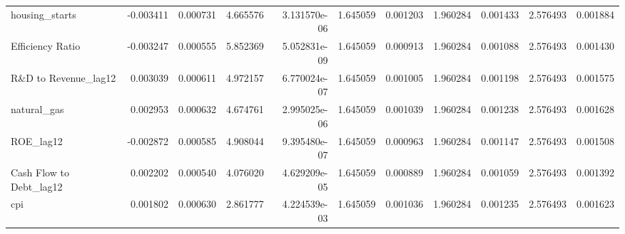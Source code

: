 \documentclass[12pt,a4paper,english]{article}
\begin{document}
{{\begin{tabular}{@{}lrrrrrrrrrr@{}}
			housing\_starts                & -0.003411                & 0.000731                    & 4.665576                  & 3.131570e-06                             & 1.645059                      & 0.001203                      & 1.960284                     & 0.001433                     & 2.576493                     & 0.001884                     \\
			Efficiency Ratio               & -0.003247                & 0.000555                    & 5.852369                  & 5.052831e-09                             & 1.645059                      & 0.000913                      & 1.960284                     & 0.001088                     & 2.576493                     & 0.001430                     \\
			R\&D to Revenue\_lag12         & 0.003039                 & 0.000611                    & 4.972157                  & 6.770024e-07                             & 1.645059                      & 0.001005                      & 1.960284                     & 0.001198                     & 2.576493                     & 0.001575                     \\
			natural\_gas                   & 0.002953                 & 0.000632                    & 4.674761                  & 2.995025e-06                             & 1.645059                      & 0.001039                      & 1.960284                     & 0.001238                     & 2.576493                     & 0.001628                     \\
			ROE\_lag12                     & -0.002872                & 0.000585                    & 4.908044                  & 9.395480e-07                             & 1.645059                      & 0.000963                      & 1.960284                     & 0.001147                     & 2.576493                     & 0.001508                     \\
			Cash Flow to Debt\_lag12       & 0.002202                 & 0.000540                    & 4.076020                  & 4.629209e-05                             & 1.645059                      & 0.000889                      & 1.960284                     & 0.001059                     & 2.576493                     & 0.001392                     \\
			cpi                            & 0.001802                 & 0.000630                    & 2.861777                  & 4.224539e-03                             & 1.645059                      & 0.001036                      & 1.960284                     & 0.001235                     & 2.576493                     & 0.001623                     \\

\end{tabular}}}
\end{document}
